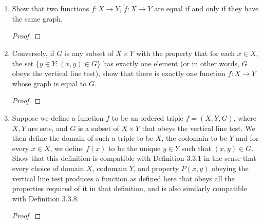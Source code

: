 \documentclass[../../main.tex]{subfiles}
\begin{document}
\begin{enumerate}
    \item \begin{q}
        Show that two functions $f : X \to Y$, $\tilde{f} : X \to Y$ are equal if and only if they have the same graph.
    \end{q}
    \begin{proof}
        
    \end{proof}
    \begin{xx}
        
    \end{xx}

    \item \begin{q}
        Conversely, if $G$ is any subset of $X \times Y$ with the property that for each $x \in X$, the set $\{y \in Y : (x, y) \in G\}$ has exactly one element (or in other words, $G$ obeys the vertical line test), show that there is exactly one function $f : X \to Y$ whose graph is equal to $G$.
    \end{q}

        
    \begin{proof}
        
    \end{proof}
    \begin{xx}
        
    \end{xx}
    \item \begin{q}
        Suppose we define a function $f$ to be an ordered triple $f = (X, Y, G)$, where $X, Y$ are sets, and $G$ is a subset of $X \times Y$ that obeys the vertical line test. We then define the domain of such a triple to be $X$, the codomain to be $Y$ and for every $x \in X$, we define $f(x)$ to be the unique $y \in Y$ such that $(x, y) \in G$. Show that this definition is compatible with Definition 3.3.1 in the sense that every choice of domain $X$, codomain $Y$, and property $P(x, y)$ obeying the vertical line test produces a function as defined here that obeys all the properties required of it in that definition, and is also similarly compatible with Definition 3.3.8.
    \end{q}
        
    \begin{proof}
        
    \end{proof}
    \begin{xx}
        
    \end{xx}

\end{enumerate}
\end{document}
